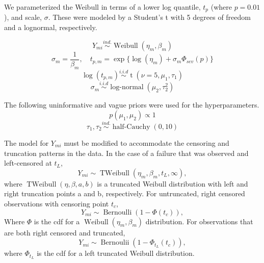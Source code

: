 \documentclass{scrartcl}
\begin{document}
\noindent We parameterized the Weibull in terms of a lower log quantile, $t_p$ (where $p=0.01$), and scale, $\sigma$. These were modeled by a Student's t with 5 degrees of freedom and a lognormal, respectively.

\[Y_{mi} \stackrel{ind.}{\sim} \operatorname{Weibull}(\eta_m, \beta_m)\]
\[\sigma_m = \frac{1}{\beta_m}, \quad t_{p,m} = \exp\{\log(\eta_m) + \sigma_m \Phi_{sev}(p)\}\]
\[\log(t_{p,m}) \stackrel{i.i.d}{\sim} \operatorname{t}(\nu = 5, \mu_1, \tau_1)\]
\[\sigma_m \stackrel{i.i.d}{\sim} \operatorname{log-normal}(\mu_2, \tau^2_2)\]

\noindent The following uninformative and vague priors were used for the hyperparameters.
\[p(\mu_1,\mu_2) \propto 1\]
\[\tau_1,\tau_2 \stackrel{ind.}{\sim} \operatorname{half-Cauchy}(0,10)\]

\noindent The model for $Y_{mi}$ must be modified to accommodate the censoring and truncation patterns in the data. In the case of a failure that was observed and left-censored at $t_L$,
\[Y_{mi} \sim \operatorname{TWeibull}(\eta_m, \beta_m, t_L, \infty),\]
where $\operatorname{TWeibull}(\eta,\beta,a,b)$ is a truncated Weibull distribution with left and right truncation points a and b, respectively. For untruncated, right censored observations with censoring point $t_c$,
\[Y_{mi} \sim \operatorname{Bernoulli}(1-\Phi(t_c)),\]
Where $\Phi$ is the cdf for a $\operatorname{Weibull}(\eta_m,\beta_m)$ distribution.
For observations that are both right censored and truncated,
\[Y_{mi} \sim \operatorname{Bernoulii}(1-\Phi_{t_L}(t_c)),\]
where $\Phi_{t_L}$ is the cdf for a left truncated Weibull distribution. 
\end{document}
